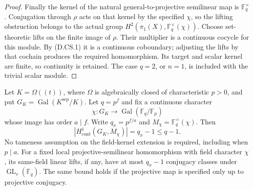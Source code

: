 \begin{proof}
Finally the kernel of the natural general-to-projective
semilinear map is \(\mathbb F_q^\times\).
Conjugation through \(\rho\) acts on that kernel by
the specified \(\chi\), so the lifting obstruction
belongs to the actual group
\(H^2(\pi_1(X),\mathbb F_q^\times(\chi))\).
Choose set-theoretic lifts on the finite image of
\(\rho\). Their multiplier is a continuous cocycle
for this module. By (D.CS.1) it is a continuous
coboundary; adjusting the lifts by that cochain
produces the required homomorphism. Its target and
scalar kernel are finite, so continuity is retained.
The case \(q=2\), or \(n=1\), is included with the
trivial scalar module.
\end{proof}

\begin{lemma}
\label{D:local-field-character-crossed-H1}
Let \(K=\Omega((t))\), where \(\Omega\) is algebraically
closed of characteristic \(p>0\), and put
\(G_K=\operatorname{Gal}(K^{\mathrm{sep}}/K)\).
Let \(q=p^f\) and fix a continuous character
\[
 \chi:G_K\longrightarrow
             \operatorname{Gal}(\mathbb F_q/\mathbb F_p)
\]
whose image has order \(a\mid f\). Write
\(q_x=p^{f/a}\) and
\(M_\chi=\mathbb F_q^\times(\chi)\).
Then
\[
 \left|H^1_{\mathrm{cont}}(G_K,M_\chi)\right|
                           =q_x-1\le q-1.             \tag{D.CS.6}
\]
No tameness assumption on the field-kernel extension
is required, including when \(p\mid a\).
For a fixed local projective-semilinear homomorphism
with field character \(\chi\), its same-field linear
lifts, if any, have at most \(q_x-1\) conjugacy classes
under \(\operatorname{GL}_r(\mathbb F_q)\).
The same bound holds if the projective map is
specified only up to projective conjugacy.
\end{lemma}

